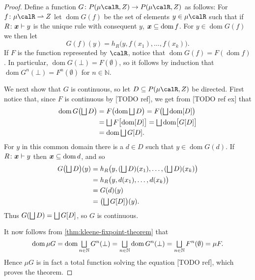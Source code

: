 \documentclass[a4paper, 11pt, article, danish, oneside]{memoir}
\newcommand{\naturals}{\mathbb{N}}
\DeclarePairedDelimiter{\auxdelimbracket}{[}{]}
\DeclareMathOperator*{\smallbigsqcup}{\textstyle\bigsqcup}
\DeclareMathOperator*{\bigdjoin}{\mathchoice
    {\smallbigsqcup}%
    {\bigsqcup}%
    {\bigsqcup}%
    {\bigsqcup}%
}
\newcommand{\image}[2][]{\auxdelimbracket[#1]{#2}}
\newcommand{\pto}{\rightharpoonup}
\newcommand{\dom}{\operatorname{dom}}
\newcommand{\pmaps}[3][]{%
    \ifstrempty{#1}%
        {%
            P(#2,#3)
        }{%
            P_{#1}(#2,#3)
        }%
}
\begin{document}
\begin{proof}
    Define a function $G \colon \pmaps{\mu\calR}{Z} \to \pmaps{\mu\calR}{Z}$ as follows: For $f \colon \mu\calR \pto Z$ let $\dom G(f)$ be the set of elements $y \in \mu\calR$ such that if $\myinfrule{R}{\seq{x}}{y}$ is the unique rule with consequent $y$, $\seq{x} \subseteq \dom f$. For $y \in \dom G(f)$ we then let
    \begin{equation*}
        G(f)(y)
            = h_R \bigl( y, f(x_1), \ldots, f(x_k) \bigr).
    \end{equation*}
    If $F$ is the function represented by $\calR$, notice that $\dom G(f) = F(\dom f)$. In particular, $\dom G(\bot) = F(\emptyset)$, so it follows by induction that $\dom G^n(\bot) = F^n(\emptyset)$ for $n \in \naturals$.

    We next show that $G$ is continuous, so let $D \subseteq \pmaps{\mu\calR}{Z}$ be directed. First notice that, since $F$ is continuous by [TODO ref], we get from [TODO ref ex] that
    \begin{align*}
        \dom G \bigl( \bigdjoin D \bigr)
            &= F \bigl( \dom \bigdjoin D \bigr)
             = F \bigl( \bigdjoin \dom \image{D} \bigr) \\
            &= \bigdjoin F\image[\big]{\dom \image{D}}
             = \bigdjoin \dom \image[\big]{G\image{D}} \\
            &= \dom \bigdjoin G\image{D}.
    \end{align*}
    For $y$ in this common domain there is a $d \in D$ such that $y \in \dom G(d)$. If $\myinfrule{R}{\seq{x}}{y}$ then $\seq{x} \subseteq \dom d$, and so
    \begin{align*}
        G \bigl( \bigdjoin D \bigr) (y)
            &= h_R \bigl( y, (\bigdjoin D)(x_1), \ldots, (\bigdjoin D)(x_k) \bigr) \\
            &= h_R \bigl( y, d(x_1), \ldots, d(x_k) \bigr) \\
            &= G(d)(y) \\
            &= \bigl( \bigdjoin G\image{D} \bigr) (y).
    \end{align*}
    Thus $G(\bigdjoin D) = \bigdjoin G\image{D}$, so $G$ is continuous.
    
    It now follows from \cref{thm:kleene-fixpoint-theorem} that
    \begin{equation*}
        \dom \mu G
            = \dom \bigdjoin_{n \in \naturals} G^n(\bot)
            = \bigdjoin_{n \in \naturals} \dom G^n(\bot)
            = \bigdjoin_{n \in \naturals} F^n(\emptyset)
            = \mu F.
    \end{equation*}
    Hence $\mu G$ is in fact a total function solving the equation [TODO ref], which proves the theorem.
\end{proof}
\end{document}

